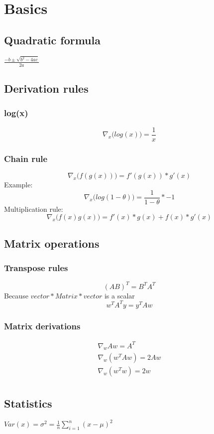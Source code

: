 \section{Basics}
\subsection{Quadratic formula}
$\frac{-b \pm \sqrt{b^{2}-4ac}}{2a}$
\subsection{Derivation rules}
\subsubsection{log(x)}
\begin{equation}
	\nabla_{x}\big( log(x) \big) = \frac{1}{x}
\end{equation}
\subsubsection{Chain rule}
\begin{equation}
	\nabla_{x}\big( f(g(x)) \big) = f'(g(x))*g'(x)
\end{equation}
Example:
\begin{equation}
	\nabla_{x}\big( log(1-\theta) \big) = \frac{1}{1-\theta}*- 1
\end{equation}
Multiplication rule:
\begin{equation}
	\nabla_{x}\big( f(x)g(x) \big) = f'(x)*g(x) + f(x)*g'(x)
\end{equation}
\subsection{Matrix operations}
\subsubsection{Transpose rules}
\begin{equation}
	(AB)^{T}= B^{T}A^{T}
\end{equation}
Because $vector * Matrix * vector$ is a scalar
\begin{equation}
	w^{T}A^{T}y = y^{T}Aw
\end{equation}
\subsubsection{Matrix derivations}
\begin{equation}
	\begin{aligned}
		\nabla_{w}Aw = A^T\\ \nabla_w(w^{T}Aw) = 2Aw\\ \nabla_w(w^{T}w) = 2w\\
	\end{aligned}
\end{equation}
\subsection{Statistics}
$Var(x) = \sigma^{2}= \frac{1}{n}\sum_{i=1}^{n}(x-\mu)^{2}$